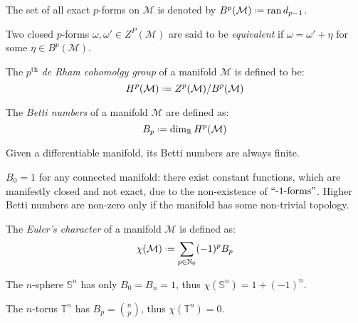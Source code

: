 \begin{definition}
  The set of all exact $ p $-forms on $ \mathcal{M} $ is denoted by $ B^p(\mathcal{M}) \defeq \ran d_{p-1} $.
\end{definition}

\begin{definition}
  Two closed $ p $-forms $ \omega,\omega' \in Z^P(\mathcal{M}) $ are said to be \textit{equivalent} if $ \omega = \omega' + \eta $ for some $ \eta \in B^p(\mathcal{M}) $.
\end{definition}

\begin{definition}
  The $ p^{\text{th}} $ \textit{de Rham cohomolgy group} of a manifold $ \mathcal{M} $ is defined to be:
  \begin{equation}
    H^p(\mathcal{M}) \defeq Z^p(\mathcal{M}) / B^p(\mathcal{M})
    \label{eq:2.42}
  \end{equation}
\end{definition}

\begin{definition}
  The \textit{Betti numbers} of a manifold $ \mathcal{M} $ are defined as:
  \begin{equation}
    B_p \defeq \dim_{\R} H^p(\mathcal{M})
    \label{eq:2.43}
  \end{equation}
\end{definition}

\begin{theorem}
  Given a differentiable manifold, its Betti numbers are always finite.
\end{theorem}

$ B_0 = 1 $ for any connected manifold: there exist constant functions, which are manifestly closed and not exact, due to the non-existence of $ ``\text{-1-forms}" $. Higher Betti numbers are non-zero only if the manifold has some non-trivial topology.

\begin{definition}
  The \textit{Euler's character} of a manifold $ \mathcal{M} $ is defined as:
  \begin{equation}
    \chi(\mathcal{M}) \defeq \sum_{p \in \N_0} (-1)^p B_p
    \label{eq:2.44}
  \end{equation}
\end{definition}

\begin{example}
  The $ n $-sphere $ \mathbb{S}^n $ has only $ B_0 = B_n = 1 $, thus $ \chi(\mathbb{S}^n) = 1 + (-1)^n $.
\end{example}
\begin{example}
  The $ n $-torus $ \mathbb{T}^n $ has $ B_p = \binom{n}{p} $, thus $ \chi(\mathbb{T}^n) = 0 $.
\end{example}

